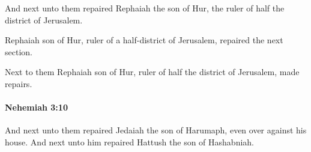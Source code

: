			\begin{versebox}
					\item[BHS] 
					\item[LXX] 
					\item[ASV] And next unto them repaired Rephaiah the son of Hur, the ruler of half the district of Jerusalem.
					\item[NIV] Rephaiah son of Hur, ruler of a half-district of Jerusalem, repaired the next section.
					\item[NRSV] Next to them Rephaiah son of Hur, ruler of half the district of Jerusalem, made repairs.
			\end{versebox}

		\paragraph{Nehemiah 3:10} %
			\label{NEHEMIAH-3-10}

			And next unto them repaired Jedaiah the son of Harumaph, even over against his house. And next unto him repaired Hattush the son of Hashabniah.

